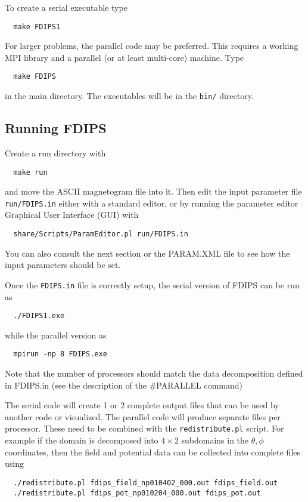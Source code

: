 \documentclass[12pt]{article}
\begin{document}
To create a serial executable type
\begin{verbatim}
  make FDIPS1
\end{verbatim}
For larger problems, the parallel code may be preferred. This requires
a working MPI library and a parallel (or at least multi-core) machine. Type
\begin{verbatim}
  make FDIPS
\end{verbatim}
in the main directory. The executables will be in the {\tt bin/} directory.

\subsection{Running FDIPS}

Create a run directory with
\begin{verbatim}
  make run
\end{verbatim}
and move the ASCII magnetogram file into it. Then edit the input parameter
file {\tt run/FDIPS.in} either with a standard editor, or by running the
parameter editor Graphical User Interface (GUI) with
\begin{verbatim}
  share/Scripts/ParamEditor.pl run/FDIPS.in
\end{verbatim}
You can also consult the next section or the PARAM.XML file to see
how the input parameters should be set.

Once the {\tt FDIPS.in} file is correctly setup, the serial version of FDIPS
can be run as
\begin{verbatim}
  ./FDIPS1.exe
\end{verbatim}
while the parallel version as
\begin{verbatim}
  mpirun -np 8 FDIPS.exe
\end{verbatim}
Note that the number of processors should match the data decomposition defined
in FDIPS.in (see the description of the \#PARALLEL command)

The serial code will create 1 or 2 complete output files that can be used
by another code or visualized. The parallel code will produce separate
files per processor. These need to be combined with the {\tt redistribute.pl}
script. For example if the domain is decomposed into $4 \times 2$ 
subdomains
in the $\theta, \phi$ coordinates, then the field and potential data
can be collected into complete files using
\begin{verbatim}
  ./redistribute.pl fdips_field_np010402_000.out fdips_field.out
  ./redistribute.pl fdips_pot_np010204_000.out fdips_pot.out
\end{verbatim}
\end{document}
